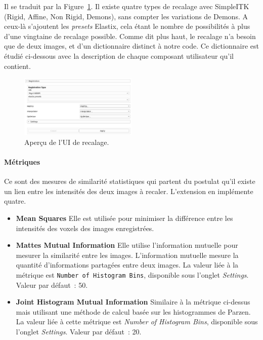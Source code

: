 \documentclass{article}
\newcommand{\subsubsubsection}[1]{\paragraph{#1}\par\noindent\bigskip}
\begin{document}
{{        Il se traduit par la Figure~\ref{fig:registration_UI}. Il existe quatre types de recalage avec SimpleITK (Rigid, Affine, Non Rigid, Demons), sans compter les variations de Demons. A ceux-là s'ajoutent les \textit{presets} Elastix, cela étant le nombre de possibilités à plus d'une vingtaine de recalage possible. Comme dit plus haut, le recalage n'a besoin que de deux images, et d'un dictionnaire distinct à notre code. Ce dictionnaire est étudié ci-dessous avec la description de chaque composant utilisateur qu'il contient.

        \bigskip

        \begin{figure}[!ht]
            \centering
            \includegraphics[width=0.5\textwidth]{images/registration_UI.png}
            \caption{Aperçu de l'UI de recalage.}
            \label{fig:registration_UI}
        \end{figure}

        \bigskip
        \subsubsubsection{Métriques}

        Ce sont des mesures de similarité statistiques qui partent du postulat qu'il existe un lien entre les intensités des deux images à recaler. L'extension en implémente quatre.

        \begin{itemize}
            \item \textbf{Mean Squares} Elle est utilisée pour minimiser la différence entre les intensités des voxels des images enregistrées.

            \item \textbf{Mattes Mutual Information} Elle utilise l'information mutuelle pour mesurer la similarité entre les images. L'information mutuelle mesure la quantité d'informations partagées entre deux images. La valeur liée à la métrique est \texttt{Number of Histogram Bins}, disponible sous l'onglet \textit{Settings}. Valeur par défaut~: 50.

            \item \textbf{Joint Histogram Mutual Information} Similaire à la métrique ci-dessus mais utilisant une méthode de calcul basée sur les histogrammes de Parzen. La valeur liée à cette métrique est \textit{Number of Histogram Bins}, disponible sous l'onglet \textit{Settings}. Valeur par défaut~: 20.


\end{itemize}}}
\end{document}
